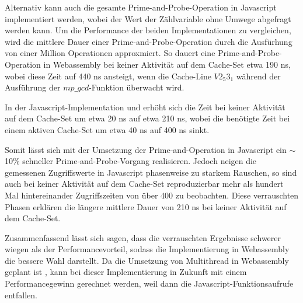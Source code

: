 Alternativ kann auch die gesamte Prime-and-Probe-Operation in Javascript implementiert werden, wobei der Wert der Zählvariable ohne Umwege abgefragt werden kann.
Um die Performance der beiden Implementationen zu vergleichen, wird die mittlere Dauer einer Prime-and-Probe-Operation durch die Ausfürhung von einer Million Operationen approxmiert.
So dauert eine Prime-and-Probe-Operation in Webassembly bei keiner Aktivität auf dem Cache-Set etwa 190 ns, wobei diese Zeit auf 440 ns ansteigt, wenn die Cache-Line $V2_5 3_1$ während der Ausführung der $mp\_gcd$-Funktion überwacht wird.

In der Javascript-Implementation und erhöht sich die Zeit bei keiner Aktivität auf dem Cache-Set um etwa 20 ns auf etwa 210 ns, wobei die benötigte Zeit bei einem aktiven Cache-Set um etwa 40 ns auf 400 ns sinkt.

Somit lässt sich mit der Umsetzung der Prime-and-Operation in Javascript ein $\sim$ 10\% schneller Prime-and-Probe-Vorgang realisieren.
Jedoch neigen die gemessenen Zugriffswerte in Javascript phasenweise zu starkem Rauschen, so sind auch bei keiner Aktivität auf dem Cache-Set reproduzierbar mehr als hundert Mal hintereinander Zugriffszeiten von über 400 zu beobachten.
Diese verrauschten Phasen erklären die längere mittlere Dauer von 210 ns bei keiner Aktivität auf dem Cache-Set.

Zusammenfassend lässt sich sagen, dass die verrauschten Ergebnisse schwerer wiegen als der Performancevorteil, sodass die Implementierung in Webassembly die bessere Wahl darstellt.
Da die Umsetzung von Multithread in Webassembly geplant ist \cite{WebassemblyThreads}, kann bei dieser Implementierung in Zukunft mit einem Performancegewinn gerechnet werden, weil dann die Javascript-Funktionsaufrufe entfallen.
